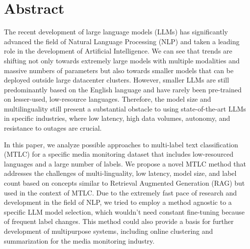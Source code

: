 % 
\chapter*{Abstract}
The recent development of large language models (LLMs) has significantly advanced the field of Natural Language Processing (NLP) and taken a leading role in the development of Artificial Intelligence.
We can see that trends are shifting not only towards extremely large models with multiple modalities and massive numbers of parameters but also towards smaller models that can be deployed outside large datacenter clusters.
However, smaller LLMs are still predominantly based on the English language and have rarely been pre-trained on lesser-used, low-resource languages.
Therefore, the model size and multilinguality still present a substantial obstacle to using state-of-the-art LLMs in specific industries, where low latency, high data volumes, autonomy, and resistance to outages are crucial.

In this paper, we analyze possible approaches to multi-label text classification (MTLC) for a specific media monitoring dataset that includes low-resourced languages and a large number of labels.
We propose a novel MTLC method that addresses the challenges of multi-linguality, low latency, model size, and label count based on concepts similar to Retrieval Augmented Generation (RAG) but used in the context of MTLC.
Due to the extremely fast pace of research and development in the field of NLP, we tried to employ a method agnostic to a specific LLM model selection, which wouldn't need constant fine-tuning because of frequent label changes.
This method could also provide a basis for further development of multipurpose systems, including online clustering and summarization for the media monitoring industry.
